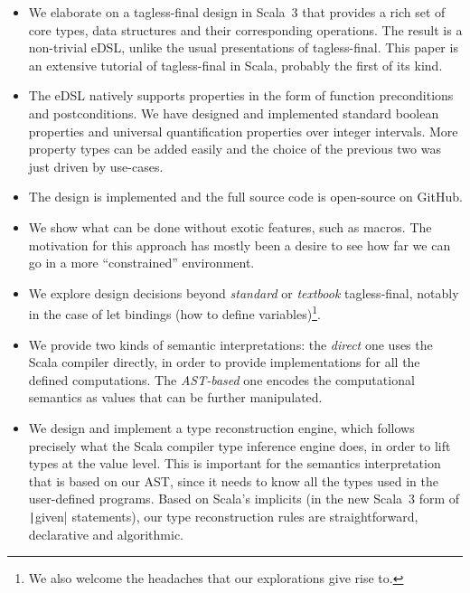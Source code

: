 \documentclass[11pt]{article}
\newcommand{\ScalaI}[1]{\texttt|#1|}
\begin{document}
\begin{itemize}
  \item We elaborate on a tagless-final design in Scala~3 that provides a 
  rich set of core types, data structures and their corresponding operations. 
  The result is a non-trivial eDSL, unlike the usual presentations of 
  tagless-final. This paper is an extensive tutorial of tagless-final in 
  Scala, probably the first of its kind.

  \item The eDSL natively supports properties in the form of function 
  preconditions and postconditions. We have designed and implemented standard 
  boolean properties and universal quantification properties over integer 
  intervals. More property types can be added easily and the choice of the 
  previous two was just driven by use-cases.

  \item The design is implemented and the full source code is open-source on 
  GitHub.

  \item We show what can be done without exotic features, such as macros. The 
  motivation for this approach has mostly been a desire to see how far we can 
  go in a more ``constrained'' environment.

  \item We explore design decisions beyond \textit{standard} or 
  \textit{textbook} tagless-final, notably in the case of let bindings (how 
  to define variables)\footnote{We also welcome the headaches that our 
  explorations give rise to.}.

  \item We provide two kinds of semantic interpretations: the \textit{direct} 
  one uses the Scala compiler directly, in order to provide implementations 
  for all the defined computations. The \textit{AST-based} one encodes the 
  computational semantics as values that can be further manipulated.

  \item We design and implement a type reconstruction engine, which follows 
  precisely what the Scala compiler type inference engine does, in order to 
  lift types at the value level. This is important for the semantics 
  interpretation that is based on our AST, since it needs to know all the 
  types used in the user-defined programs. Based on Scala's implicits (in the 
  new Scala~3 form of \ScalaI{given} statements), our type reconstruction 
  rules are straightforward, declarative and algorithmic.


\end{itemize}
\end{document}
